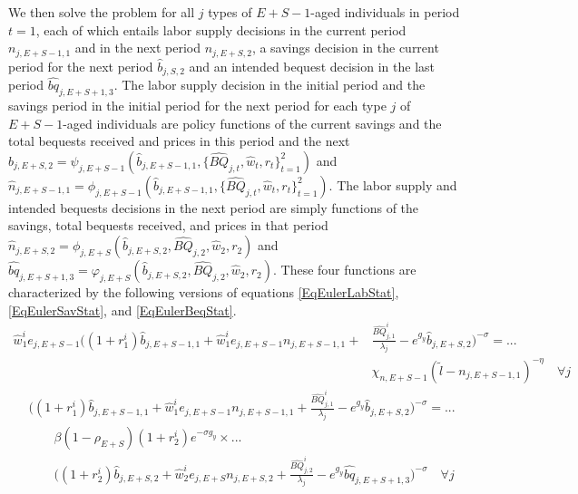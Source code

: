 \documentclass[letterpaper,12pt]{article}
\theoremstyle{definition}
\begin{document}
  We then solve the problem for all $j$ types of $E+S-1$-aged individuals in period $t=1$, each of which entails labor supply decisions in the current period $n_{j,E+S-1,1}$ and in the next period $n_{j,E+S,2}$, a savings decision in the current period for the next period $\hat{b}_{j,S,2}$ and an intended bequest decision in the last period $\hat{bq}_{j,E+S+1,3}$. The labor supply decision in the initial period and the savings period in the initial period for the next period for each type $j$ of $E+S-1$-aged individuals are policy functions of the current savings and the total bequests received and prices in this period and the next $\hat{b}_{j,E+S,2} = \psi_{j,E+S-1}(\hat{b}_{j,E+S-1,1},\{\hat{BQ}_{j,t},\hat{w}_t,r_t\}_{t=1}^2)$ and $\hat{n}_{j,E+S-1,1} = \phi_{j,E+S-1}(\hat{b}_{j,E+S-1,1},\{\hat{BQ}_{j,t},\hat{w}_t,r_t\}_{t=1}^2)$. The labor supply and intended bequests decisions in the next period are simply functions of the savings, total bequests received, and prices in that period $\hat{n}_{j,E+S,2} = \phi_{j,E+S}(\hat{b}_{j,E+S,2},\hat{BQ}_{j,2},\hat{w}_2,r_2)$ and $\hat{bq}_{j,E+S+1,3} = \varphi_{j,E+S}(\hat{b}_{j,E+S,2},\hat{BQ}_{j,2},\hat{w}_2,r_2)$. These four functions are characterized by the following versions of equations \eqref{EqEulerLabStat}, \eqref{EqEulerSavStat}, and \eqref{EqEulerBeqStat}.
  \begin{equation}\label{EqEulerSm1labt1}
    \begin{split}
      \hat{w}_1^i e_{j,E+S-1}\biggl(\left(1+r_1^i\right)\hat{b}_{j,E+S-1,1} + \hat{w}_1^i e_{j,E+S-1}n_{j,E+S-1,1} + &\frac{\hat{BQ}_{j,1}^i}{\lambda_j} - e^{g_y}\hat{b}_{j,E+S,2}\biggr)^{-\sigma} = ... \\
      &\chi_{n,E+S-1}(\tilde{l} - n_{j,E+S-1,1})^{-\eta} \quad\forall j
    \end{split}
  \end{equation}
  \begin{equation}\label{EqEulerSm1savt1}
    \begin{split}
      &\biggl(\left(1+r_1^i\right)\hat{b}_{j,E+S-1,1} + \hat{w}_1^i e_{j,E+S-1}n_{j,E+S-1,1} + \frac{\hat{BQ}_{j,1}^i}{\lambda_j} - e^{g_y}\hat{b}_{j,E+S,2}\biggr)^{-\sigma} = ... \\
      &\quad\quad\beta(1-\rho_{E+S})(1+r_2^i)e^{-\sigma g_y}\times ... \\
      &\quad\quad \biggl(\left(1+r_2^i\right)\hat{b}_{j,E+S,2} + \hat{w}_2^i e_{j,E+S}n_{j,E+S,2} + \frac{\hat{BQ}_{j,2}^i}{\lambda_j} - e^{g_y}\hat{bq}_{j,E+S+1,3}\biggr)^{-\sigma} \quad\forall j
    \end{split}
  \end{equation}
\end{document}
